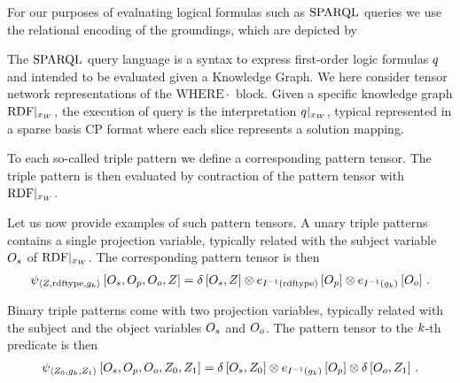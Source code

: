 

For our purposes of evaluating logical formulas such as $\mathrm{SPARQL}$ queries we use the relational encoding of the groundings, which are depicted by
\begin{center}
    
\end{center}





The $\mathrm{SPARQL}$ query language is a syntax to express first-order logic formulas $q$ and intended to be evaluated given a Knowledge Graph.
We here consider tensor network representations of the $\mathrm{WHERE}{\cdot}$ block.
Given a specific knowledge graph ${\mathrm{RDF}}|_{x_{W}}$, the execution of query is the interpretation ${q}|_{x_{W}}$, typical represented in a sparse basis CP format where each slice represents a solution mapping.


To each so-called triple pattern we define a corresponding pattern tensor.
The triple pattern is then evaluated by contraction of the pattern tensor with ${\mathrm{RDF}}|_{x_{W}}$.

Let us now provide examples of such pattern tensors.
A unary triple patterns contains a single projection variable, typically related with the subject variable $O_{s}$ of ${\mathrm{RDF}}|_{x_{W}}$.
The corresponding pattern tensor is then
\begin{align*}
    \psi_{\braket{Z,\mathrm{rdftype},g_{k}}}\left[
        O_{s}, O_{p}, O_{o}, Z
    \right]
    = \delta\left[O_{s},Z\right]
    \otimes e_{I^{-1}(\mathrm{rdftype})}\left[O_{p}\right]
    \otimes e_{I^{-1}(g_{k})}\left[O_{o}\right] \, .
\end{align*}

Binary triple patterns come with two projection variables, typically related with the subject and the object variables $O_{s}$ and $O_{o}$.
The pattern tensor to the $k$-th predicate is then
\begin{align*}
    \psi_{\braket{Z_{0},g_{k},Z_{1}}}\left[
        O_{s}, O_{p}, O_{o}, Z_{0}, Z_{1}
    \right]
    = \delta\left[O_{s},Z_{0}\right]
    \otimes e_{I^{-1}(g_{k})}\left[O_{p}\right]
    \otimes \delta\left[O_{o},Z_{1}\right] \, .
\end{align*}

